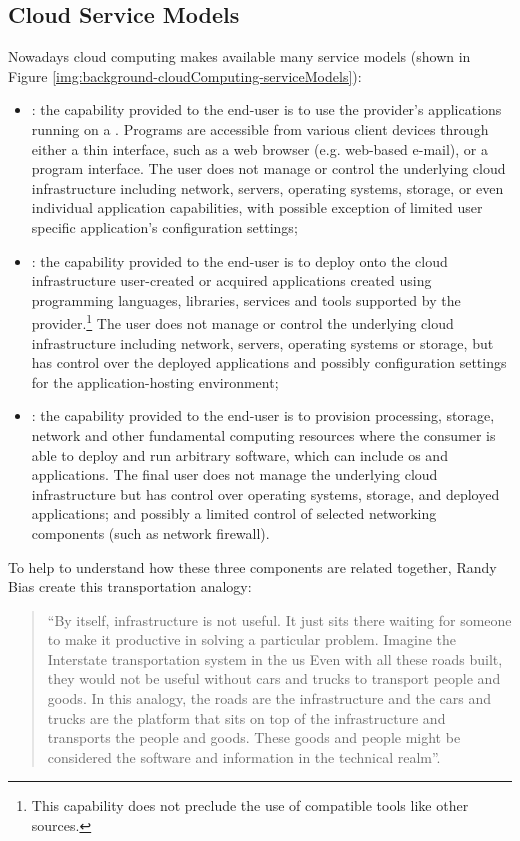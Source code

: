 \subsection{Cloud Service Models}
\label{sec:background-cloudComputing-cloudServiceModels}
Nowadays cloud computing makes available many service models (shown in Figure
\ref{img:background-cloudComputing-serviceModels}):

\begin{itemize}
	\item{: the capability provided to the end-user is to use the provider's
		applications running on a . Programs are accessible from various
		client devices through either a thin interface, such as a web browser (e.g. web-based e-mail),
		or a program interface. The user does not manage or control the underlying cloud infrastructure
		including network, servers, operating systems, storage, or even individual application capabilities,
		with possible exception of limited user specific application's configuration settings;}
	\item{: the capability provided to the end-user is to deploy onto the cloud
		infrastructure user-created or acquired applications created using programming languages,
		libraries, services and tools supported by the provider.\footnote{This capability does not preclude
		the use of compatible tools like other sources.} The user does not manage or control the underlying
		cloud infrastructure including network, servers, operating systems or storage, but has control
		over the deployed applications and possibly configuration settings for the application-hosting
		environment;}
	\item{: the capability provided to the end-user is to provision processing, storage,
		network and other fundamental computing resources where the consumer is able to deploy and run
		arbitrary software, which can include \acs{os} and applications. The final user does not
		manage the underlying cloud infrastructure but has control over operating systems, storage, and
		deployed applications; and possibly a limited control of selected networking components (such as
		network firewall).}
\end{itemize}

To help to understand how these three components are related together, Randy Bias \cite{differenceIaasPaas}
create this transportation analogy:

\begin{quote}
	``By itself, infrastructure is not useful. It just sits there waiting for someone to make it productive in
	solving a particular problem. Imagine the Interstate transportation system in the \acs{us} Even with all
	these roads built, they would not be useful without cars and trucks to transport people and goods. In this
	analogy, the roads are the infrastructure and the cars and trucks are the platform that sits on top of the
	infrastructure and transports the people and goods. These goods and people might be considered the software
	and information in the technical realm''.
\end{quote}


